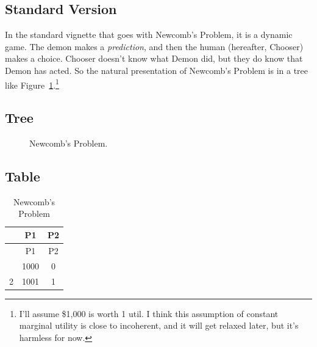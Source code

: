\documentclass[
  10pt,
  letterpaper,
  DIV=11,
  numbers=noendperiod,
  twoside]{scrartcl}
\begin{document}
\subsection{Standard Version}\label{standard-version}

In the standard vignette that goes with Newcomb's Problem, it is a
dynamic game. The demon makes a \emph{prediction}, and then the human
(hereafter, Chooser) makes a choice. Chooser doesn't know what Demon
did, but they do know that Demon has acted. So the natural presentation
of Newcomb's Problem is in a tree like
Figure~\ref{fig-standard-newcomb}.\footnote{I'll assume \$1,000 is worth
  1 util. I think this assumption of constant marginal utility is close
  to incoherent, and it will get relaxed later, but it's harmless for
  now.}

\subsection{Tree}

\begin{figure}


\caption{\label{fig-standard-newcomb}Newcomb's Problem.}

\end{figure}%

\subsection{Table}

\begin{longtable}[]{@{}ccc@{}}
\caption{Newcomb's Problem}\label{tbl-standard-newcomb}\tabularnewline
\toprule\noalign{}
& P1 & P2 \\
\midrule\noalign{}
\endfirsthead
\toprule\noalign{}
& P1 & P2 \\
\midrule\noalign{}
\endhead
\bottomrule\noalign{}
\endlastfoot
1 & 1000 & 0 \\
2 & 1001 & 1 \\
\end{longtable}
\end{document}

